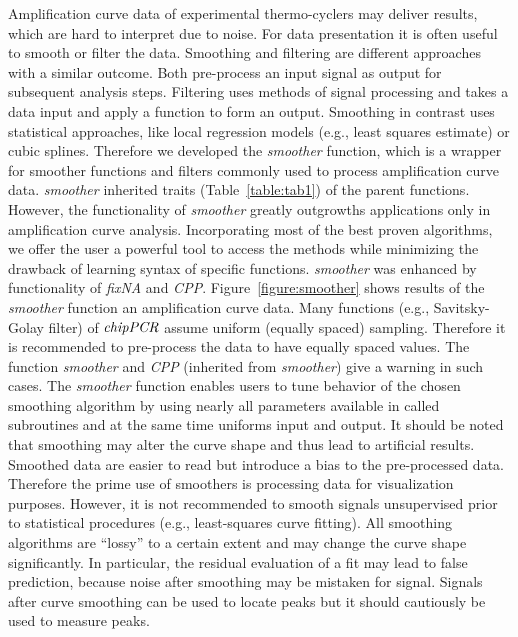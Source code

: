 \documentclass[twocolumn]{bmcart}%
\begin{document}
  Amplification curve data of experimental thermo-cyclers may deliver results, 
which are hard to interpret due to noise. For data presentation it 
is often useful to smooth or filter the data. Smoothing and filtering are 
different approaches with a similar outcome. Both pre-process an input signal as 
output for subsequent analysis steps. Filtering uses methods of signal 
processing and takes a data input and apply a function to form an output. 
Smoothing in contrast uses statistical approaches, like local 
regression models (e.g., least squares estimate) or cubic splines. 
Therefore we developed the \textsl{smoother} function, which is a wrapper for 
smoother functions and filters commonly used to process amplification curve 
data. \textsl{smoother} inherited traits (Table~\ref{table:tab1})  of the 
parent functions. However, the functionality of \textsl{smoother} greatly 
outgrowths applications only in amplification curve analysis. Incorporating most 
of the best proven algorithms, we offer the user a powerful tool to access the 
methods while minimizing the drawback of learning syntax of specific functions. 
\textsl{smoother} was enhanced by functionality of \textsl{fixNA} and 
\textsl{CPP}. Figure~\ref{figure:smoother} shows results of the 
\textsl{smoother} function an amplification curve data. Many functions (e.g., 
Savitsky-Golay filter) of $\emph{chipPCR}$ assume uniform (equally spaced) 
sampling. Therefore it is recommended to pre-process the data to have equally 
spaced values. The function \textsl{smoother} and \textsl{CPP} (inherited from 
\textsl{smoother}) give a warning in such cases. The \textsl{smoother} function 
enables users to tune behavior of the chosen smoothing algorithm by using nearly 
all parameters available in called subroutines and at the same time uniforms 
input and output. It should be noted that smoothing may alter the curve shape 
and thus lead to artificial results. Smoothed data are easier to read 
but introduce a bias to the pre-processed data. Therefore the prime 
use of smoothers is processing data for visualization purposes. However, it is 
not recommended to smooth signals unsupervised prior to statistical procedures 
(e.g., least-squares curve fitting). All smoothing algorithms are ``lossy'' to a 
certain extent and may change the curve shape significantly. In particular, the 
residual evaluation of a fit may lead to false prediction, because noise after 
smoothing may be mistaken for signal. Signals after curve smoothing can be used 
to locate peaks but it should cautiously be used to measure peaks.
\end{document}
